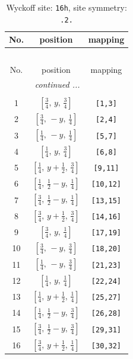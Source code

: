 \documentclass[fleqn,8pt]{jsarticle}
\begin{document}
\begin{longtable}{ccc}
\caption{Wyckoff site: {\tt 16h}, site symmetry: {\tt .2.}}
 \\
 \hline \hline
No. & position & mapping \\ \hline \endfirsthead

\multicolumn{2}{l}{\tablename\ \thetable{}} \\
 \hline \hline
No. & position & mapping \\ \hline \endhead

 \hline \hline
\multicolumn{2}{r}{\footnotesize\it continued ...} \\ \endfoot

 \hline \hline
\multicolumn{2}{r}{} \\ \endlastfoot

1 & $\left[ \frac{3}{4},\, y,\, \frac{3}{4} \right]$ & {\tt [1,3]} \\ \hline
2 & $\left[ \frac{3}{4},\, - y,\, \frac{1}{4} \right]$ & {\tt [2,4]} \\ \hline
3 & $\left[ \frac{1}{4},\, - y,\, \frac{1}{4} \right]$ & {\tt [5,7]} \\ \hline
4 & $\left[ \frac{1}{4},\, y,\, \frac{3}{4} \right]$ & {\tt [6,8]} \\ \hline
5 & $\left[ \frac{1}{4},\, y + \frac{1}{2},\, \frac{3}{4} \right]$ & {\tt [9,11]} \\ \hline
6 & $\left[ \frac{1}{4},\, \frac{1}{2} - y,\, \frac{1}{4} \right]$ & {\tt [10,12]} \\ \hline
7 & $\left[ \frac{3}{4},\, \frac{1}{2} - y,\, \frac{1}{4} \right]$ & {\tt [13,15]} \\ \hline
8 & $\left[ \frac{3}{4},\, y + \frac{1}{2},\, \frac{3}{4} \right]$ & {\tt [14,16]} \\ \hline
9 & $\left[ \frac{3}{4},\, y,\, \frac{1}{4} \right]$ & {\tt [17,19]} \\ \hline
10 & $\left[ \frac{3}{4},\, - y,\, \frac{3}{4} \right]$ & {\tt [18,20]} \\ \hline
11 & $\left[ \frac{1}{4},\, - y,\, \frac{3}{4} \right]$ & {\tt [21,23]} \\ \hline
12 & $\left[ \frac{1}{4},\, y,\, \frac{1}{4} \right]$ & {\tt [22,24]} \\ \hline
13 & $\left[ \frac{1}{4},\, y + \frac{1}{2},\, \frac{1}{4} \right]$ & {\tt [25,27]} \\ \hline
14 & $\left[ \frac{1}{4},\, \frac{1}{2} - y,\, \frac{3}{4} \right]$ & {\tt [26,28]} \\ \hline
15 & $\left[ \frac{3}{4},\, \frac{1}{2} - y,\, \frac{3}{4} \right]$ & {\tt [29,31]} \\ \hline
16 & $\left[ \frac{3}{4},\, y + \frac{1}{2},\, \frac{1}{4} \right]$ & {\tt [30,32]} \\
\end{longtable}
\end{document}
